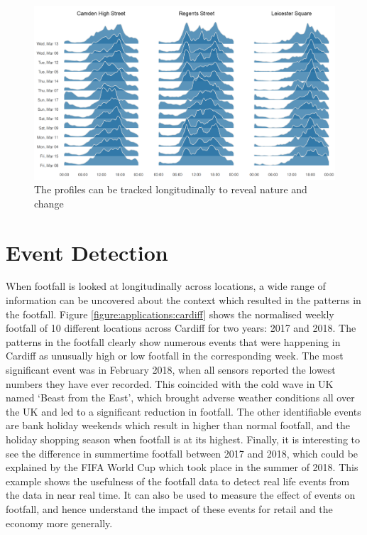 \begin{figure}
  \includegraphics[trim={0 10 0 0},clip]{images/applications-location-profiles.png}
  \caption{The profiles can be tracked longitudinally to reveal nature and change}
  \label{}
\end{figure}

\section{Event Detection}

When footfall is looked at longitudinally across locations, a wide range of information can be uncovered about the context which resulted in the patterns in the footfall. Figure \ref{figure:applications:cardiff} shows the normalised weekly footfall of 10 different locations across Cardiff for two years: 2017 and 2018. The patterns in the footfall clearly show numerous events that were happening in Cardiff as unusually high or low footfall in the corresponding week. The most significant event was in February 2018, when all sensors reported the lowest numbers they have ever recorded. This coincided with the cold wave in UK named ‘Beast from the East’, which brought adverse weather conditions all over the UK and led to a significant reduction in footfall. The other identifiable events are bank holiday weekends which result in higher than normal footfall, and the holiday shopping season when footfall is at its highest. Finally, it is interesting to see the difference in summertime footfall between 2017 and 2018, which could be explained by the FIFA World Cup which took place in the summer of 2018. This example shows the usefulness of the footfall data to detect real life events from the data in near real time. It can also be used to measure the effect of events on footfall, and hence understand the impact of these events for retail and the  economy more generally.

